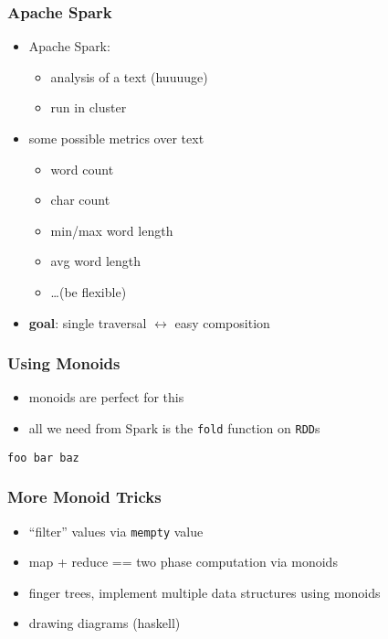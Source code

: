 \documentclass{beamer}
\begin{document}
\begin{frame}
  \frametitle{Apache Spark}
  \begin{itemize}
  \item Apache Spark:
    \begin{itemize}
    \item analysis of a text (huuuuge)
    \item run in cluster
    \end{itemize}
  \item some possible metrics over text
    \begin{itemize}
    \item word count
    \item char count
    \item min/max word length
    \item avg word length
    \item \dots (be flexible)
    \end{itemize}
  \item \textbf{goal}: single traversal $\leftrightarrow$ easy composition
  \end{itemize}
\end{frame}

\begin{frame}[fragile]
  \frametitle{Using Monoids}
  \begin{itemize}
  \item monoids are perfect for this
  \item all we need from Spark is the \texttt{fold} function on \texttt{RDD}s
  \end{itemize}
\begin{verbatim}
foo bar baz
\end{verbatim}
\end{frame}


\begin{frame}
  \frametitle{More Monoid Tricks}
  \begin{itemize}
  \item ``filter'' values via \texttt{mempty} value
  \item map + reduce == two phase computation via monoids
  \item finger trees, implement multiple data structures using monoids
  \item drawing diagrams (haskell)
  \end{itemize}
\end{frame}
\end{document}
